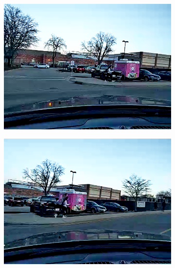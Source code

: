 \begin{figure}[ht]
   \begin{subfigure}[t]{0.25\textwidth}
    \includegraphics[width=\linewidth]{Figs/RTDrive/evaluation/frames/context_0.png}
  \end{subfigure}%
  \begin{subfigure}[t]{0.25\textwidth}
    \includegraphics[width=\linewidth]{Figs/RTDrive/evaluation/frames/context_1.png}
  \end{subfigure}%
  \begin{subfigure}[t]{0.25\textwidth}

\end{subfigure}
\end{figure}
